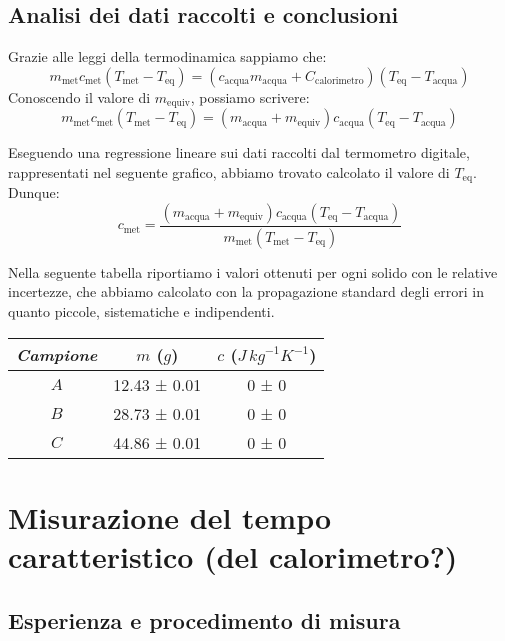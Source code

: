 \documentclass{article}
\begin{document}
\subsection{Analisi dei dati raccolti e conclusioni}
Grazie alle leggi della termodinamica sappiamo che:
    \[
        m_\text{met} c_\text{met} (T_\text{met}-T_\text{eq}) =
        (c_\text{acqua} m_\text{acqua} + C_\text{calorimetro}) (T_\text{eq}-T_\text{acqua})
    \]   
Conoscendo il valore di $m_\text{equiv}$, possiamo scrivere:
    \[
        m_\text{met} c_\text{met} (T_\text{met}-T_\text{eq}) =
        (m_\text{acqua} + m_\text{equiv}) c_\text{acqua} (T_\text{eq}-T_\text{acqua})
    \]

Eseguendo una regressione lineare sui dati raccolti dal termometro digitale, rappresentati nel    %
seguente grafico, abbiamo trovato calcolato il valore di $T_\text{eq}$. Dunque:
    \[
        c_\text{met} = \frac{(m_\text{acqua} + m_\text{equiv}) c_\text{acqua} (T_\text{eq}-T_\text{acqua})}
        {m_\text{met} (T_\text{met}-T_\text{eq})}
    \]

Nella seguente tabella riportiamo i valori ottenuti per ogni solido con le relative incertezze, che abbiamo calcolato con la
propagazione standard degli errori in quanto piccole, sistematiche e indipendenti.

\begin{center}
    \begin{tabular}{ |c|c|c| }
        \hline
        \emph{Campione} & $m$ ($\unit{g}$) & $c$ ($\unit{J \, {kg}^{-1} {K}^{-1} }$) \\
        \hline
        $A$ & 12.43 ± 0.01 & 0 ± 0 \\
        $B$ & 28.73 ± 0.01 & 0 ± 0 \\    %
        $C$ & 44.86 ± 0.01 & 0 ± 0 \\
        \hline
    \end{tabular}
\end{center}



\section{Misurazione del tempo caratteristico (del calorimetro?)}
    
\subsection{Esperienza e procedimento di misura}
\end{document}
